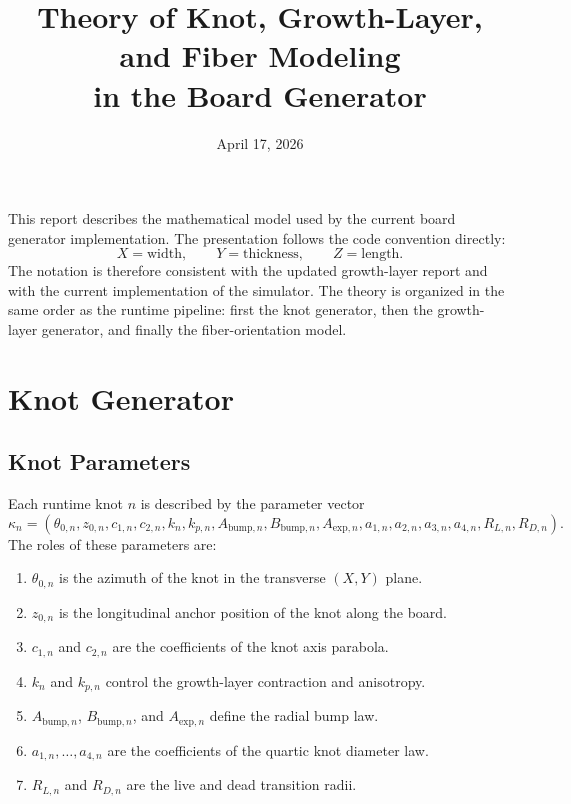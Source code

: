\documentclass[11pt]{article}
\title{Theory of Knot, Growth-Layer, and Fiber Modeling\\in the Board Generator}
\date{April 17, 2026}
\begin{document}
\maketitle

This report describes the mathematical model used by the current board generator implementation. The
presentation follows the code convention directly:
\[
X = \text{width}, \qquad Y = \text{thickness}, \qquad Z = \text{length}.
\]
The notation is therefore consistent with the updated growth-layer report and with the current
implementation of the simulator. The theory is organized in the same order as the runtime pipeline:
first the knot generator, then the growth-layer generator, and finally the fiber-orientation model.

\section{Knot Generator}

\subsection{Knot Parameters}

Each runtime knot $n$ is described by the parameter vector
\begin{equation}
\kappa_n =
\left(
\theta_{0,n}, z_{0,n}, c_{1,n}, c_{2,n}, k_n, k_{p,n},
A_{\mathrm{bump},n}, B_{\mathrm{bump},n}, A_{\mathrm{exp},n},
a_{1,n}, a_{2,n}, a_{3,n}, a_{4,n}, R_{L,n}, R_{D,n}
\right).
\end{equation}
The roles of these parameters are:
\begin{enumerate}
\item $\theta_{0,n}$ is the azimuth of the knot in the transverse $(X,Y)$ plane.
\item $z_{0,n}$ is the longitudinal anchor position of the knot along the board.
\item $c_{1,n}$ and $c_{2,n}$ are the coefficients of the knot axis parabola.
\item $k_n$ and $k_{p,n}$ control the growth-layer contraction and anisotropy.
\item $A_{\mathrm{bump},n}$, $B_{\mathrm{bump},n}$, and $A_{\mathrm{exp},n}$ define the radial bump law.
\item $a_{1,n},\ldots,a_{4,n}$ are the coefficients of the quartic knot diameter law.
\item $R_{L,n}$ and $R_{D,n}$ are the live and dead transition radii.
\end{enumerate}
\end{document}
